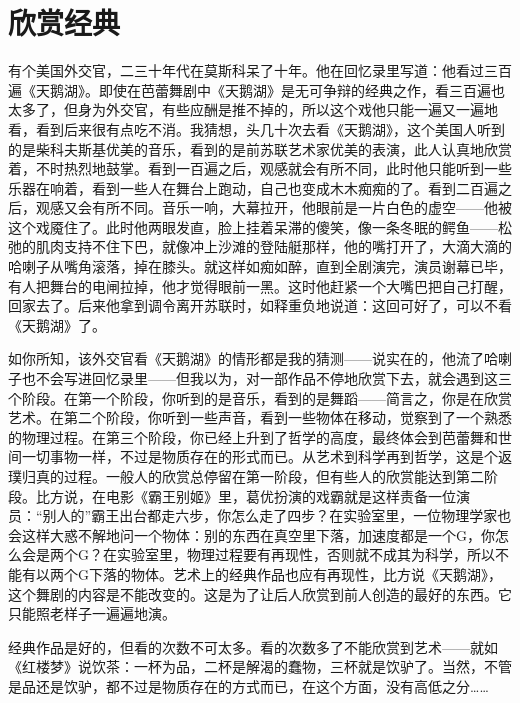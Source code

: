 \chapter{欣赏经典}


有个美国外交官，二三十年代在莫斯科呆了十年。他在回忆录里写道：他看过三百遍《天鹅湖》。即使在芭蕾舞剧中《天鹅湖》是无可争辩的经典之作，看三百遍也太多了，但身为外交官，有些应酬是推不掉的，所以这个戏他只能一遍又一遍地看，看到后来很有点吃不消。我猜想，头几十次去看《天鹅湖》，这个美国人听到的是柴科夫斯基优美的音乐，看到的是前苏联艺术家优美的表演，此人认真地欣赏着，不时热烈地鼓掌。看到一百遍之后，观感就会有所不同，此时他只能听到一些乐器在响着，看到一些人在舞台上跑动，自己也变成木木痴痴的了。看到二百遍之后，观感又会有所不同。音乐一响，大幕拉开，他眼前是一片白色的虚空——他被这个戏魇住了。此时他两眼发直，脸上挂着呆滞的傻笑，像一条冬眠的鳄鱼——松弛的肌肉支持不住下巴，就像冲上沙滩的登陆艇那样，他的嘴打开了，大滴大滴的哈喇子从嘴角滚落，掉在膝头。就这样如痴如醉，直到全剧演完，演员谢幕已毕，有人把舞台的电闸拉掉，他才觉得眼前一黑。这时他赶紧一个大嘴巴把自己打醒，回家去了。后来他拿到调令离开苏联时，如释重负地说道：这回可好了，可以不看《天鹅湖》了。　 

如你所知，该外交官看《天鹅湖》的情形都是我的猜测——说实在的，他流了哈喇子也不会写进回忆录里——但我以为，对一部作品不停地欣赏下去，就会遇到这三个阶段。在第一个阶段，你听到的是音乐，看到的是舞蹈——简言之，你是在欣赏艺术。在第二个阶段，你听到一些声音，看到一些物体在移动，觉察到了一个熟悉的物理过程。在第三个阶段，你已经上升到了哲学的高度，最终体会到芭蕾舞和世间一切事物一样，不过是物质存在的形式而已。从艺术到科学再到哲学，这是个返璞归真的过程。一般人的欣赏总停留在第一阶段，但有些人的欣赏能达到第二阶段。比方说，在电影《霸王别姬》里，葛优扮演的戏霸就是这样责备一位演员：“别人的”霸王出台都走六步，你怎么走了四步？在实验室里，一位物理学家也会这样大惑不解地问一个物体：别的东西在真空里下落，加速度都是一个G，你怎么会是两个G？在实验室里，物理过程要有再现性，否则就不成其为科学，所以不能有以两个G下落的物体。艺术上的经典作品也应有再现性，比方说《天鹅湖》，这个舞剧的内容是不能改变的。这是为了让后人欣赏到前人创造的最好的东西。它只能照老样子一遍遍地演。　 

经典作品是好的，但看的次数不可太多。看的次数多了不能欣赏到艺术——就如《红楼梦》说饮茶：一杯为品，二杯是解渴的蠢物，三杯就是饮驴了。当然，不管是品还是饮驴，都不过是物质存在的方式而已，在这个方面，没有高低之分……　 

